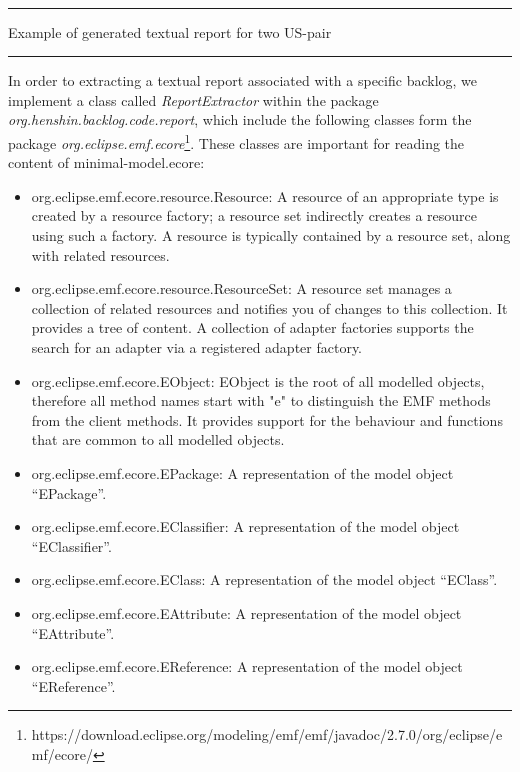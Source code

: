 \begin{MyListing}
\paragraph{}
\hrule
\centering

\caption{Example of generated textual report for two US-pair}\label{list:textual_report_sample}
\hrule
\end{MyListing}
In order to extracting a textual report associated with a specific backlog, we implement a class called \textit{ReportExtractor} within the package \textit{org.henshin.backlog.code.report}, which include the following classes form the package \textit{org.eclipse.emf.ecore}\footnote{https://download.eclipse.org/modeling/emf/emf/javadoc/2.7.0/org/eclipse/emf/ecore/}. These classes are important for reading the content of minimal-model.ecore:
\begin{itemize}
	\item org.eclipse.emf.ecore.resource.Resource: A resource of an appropriate type is created by a resource factory; a resource set indirectly creates a resource using such a factory. A resource is typically contained by a resource set, along with related resources.
	\item org.eclipse.emf.ecore.resource.ResourceSet: A resource set manages a collection of related resources and notifies you of changes to this collection. It provides a tree of content. A collection of adapter factories supports the search for an adapter via a registered adapter factory. 
	\item org.eclipse.emf.ecore.EObject: EObject is the root of all modelled objects, therefore all method names start with "e" to distinguish the EMF methods from the client methods. It provides support for the behaviour and functions that are common to all modelled objects.
	\item org.eclipse.emf.ecore.EPackage: A representation of the model object \enquote{EPackage}.
	\item org.eclipse.emf.ecore.EClassifier: A representation of the model object \enquote{EClassifier}.
	\item org.eclipse.emf.ecore.EClass: A representation of the model object \enquote{EClass}.
	\item org.eclipse.emf.ecore.EAttribute: A representation of the model object \enquote{EAttribute}.
	\item org.eclipse.emf.ecore.EReference:  A representation of the model object \enquote{EReference}.
	
\end{itemize}
